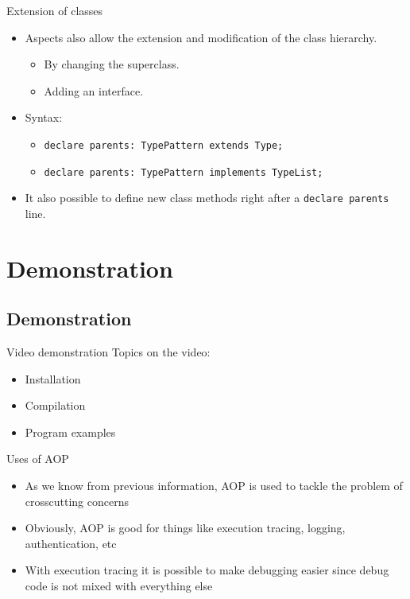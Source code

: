 \documentclass[11pt]{beamer}
\begin{document}
\begin{frame}{Extension of classes}
   \begin{itemize}
      \item Aspects also allow the extension and modification of the class hierarchy.
      \begin{itemize}
         \item By changing the superclass.
         \item Adding an interface.
      \end{itemize}
      \item Syntax:
      \begin{itemize}
         \item \texttt{declare parents: TypePattern extends Type;}
         \item \texttt{declare parents: TypePattern implements TypeList;}
      \end{itemize}
      \item It also possible to define new class methods right after a \texttt{declare parents} line.
   \end{itemize}
\end{frame}

\section{Demonstration}
\subsection*{Demonstration}

\begin{frame}{Video demonstration}
Topics on the video:
\begin{itemize}
\item Installation
\item Compilation
\item Program examples
\end{itemize}
\end{frame}

\begin{frame}{Uses of AOP}
\begin{itemize}
   \item As we know from previous information, AOP is used to tackle the problem of crosscutting concerns
   \item Obviously, AOP is good for things like execution tracing, logging, authentication, etc
   \item With execution tracing it is possible to make debugging easier since debug code is not mixed with everything else
\end{itemize}
\end{frame}
\end{document}
